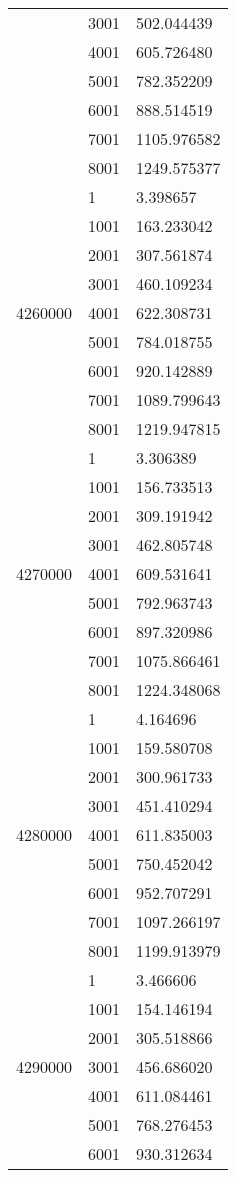 \begin{table}[htb!]
\begin{tabular}{lll}
 & 3001 & 502.044439 \\
 & 4001 & 605.726480 \\
 & 5001 & 782.352209 \\
 & 6001 & 888.514519 \\
 & 7001 & 1105.976582 \\
 & 8001 & 1249.575377 \\
\multirow[c]{9}{*}{4260000} & 1 & 3.398657 \\
 & 1001 & 163.233042 \\
 & 2001 & 307.561874 \\
 & 3001 & 460.109234 \\
 & 4001 & 622.308731 \\
 & 5001 & 784.018755 \\
 & 6001 & 920.142889 \\
 & 7001 & 1089.799643 \\
 & 8001 & 1219.947815 \\
\multirow[c]{9}{*}{4270000} & 1 & 3.306389 \\
 & 1001 & 156.733513 \\
 & 2001 & 309.191942 \\
 & 3001 & 462.805748 \\
 & 4001 & 609.531641 \\
 & 5001 & 792.963743 \\
 & 6001 & 897.320986 \\
 & 7001 & 1075.866461 \\
 & 8001 & 1224.348068 \\
\multirow[c]{9}{*}{4280000} & 1 & 4.164696 \\
 & 1001 & 159.580708 \\
 & 2001 & 300.961733 \\
 & 3001 & 451.410294 \\
 & 4001 & 611.835003 \\
 & 5001 & 750.452042 \\
 & 6001 & 952.707291 \\
 & 7001 & 1097.266197 \\
 & 8001 & 1199.913979 \\
\multirow[c]{9}{*}{4290000} & 1 & 3.466606 \\
 & 1001 & 154.146194 \\
 & 2001 & 305.518866 \\
 & 3001 & 456.686020 \\
 & 4001 & 611.084461 \\
 & 5001 & 768.276453 \\
 & 6001 & 930.312634 \\

\end{tabular}
\end{table}
